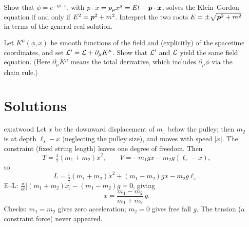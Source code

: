 \documentclass[11pt]{article}
\begin{document}
\begin{exercise}\label{ex:KG}
Show that $\phi=e^{-ip\cdot x}$, with $p\cdot x=p_\mu x^\mu=Et-\bm{p}\cdot\bm{x}$, solves the Klein--Gordon equation if and only if $E^2=\bm{p}^2+m^2$. Interpret the two roots $E=\pm\sqrt{\bm{p}^2+m^2}$ in terms of the general real solution.
\end{exercise}

\begin{exercise}\label{ex:fielddiv}
Let $K^\mu(\phi,x)$ be smooth functions of the field and (explicitly) of the spacetime coordinates, and set $\mathcal{L}'=\mathcal{L}+\partial_\mu K^\mu$. Show that $\mathcal{L}'$ and $\mathcal{L}$ yield the same field equation. (Here $\partial_\mu K^\mu$ means the total derivative, which includes $\partial_\mu\phi$ via the chain rule.)
\end{exercise}

\section{Solutions}

\begin{solution}{ex:atwood}
Let $x$ be the downward displacement of $m_1$ below the pulley; then $m_2$ is at depth $\ell_s-x$ (neglecting the pulley size), and moves with speed $|\dot x|$. The constraint (fixed string length) leaves one degree of freedom. Then
\[
 T=\tfrac12(m_1+m_2)\dot x^2,\qquad V=-m_1gx-m_2g(\ell_s-x),
\]
so
\[
 L=\tfrac12(m_1+m_2)\dot x^2+(m_1-m_2)gx-m_2g\ell_s .
\]
E--L: $\frac{\dd}{\dd t}\bigl[(m_1+m_2)\dot x\bigr]-(m_1-m_2)g=0$, giving
\[
 \ddot x=\frac{m_1-m_2}{m_1+m_2}\,g .
\]
Checks: $m_1=m_2$ gives zero acceleration; $m_2=0$ gives free fall $g$. The tension (a constraint force) never appeared.
\end{solution}
\end{document}
